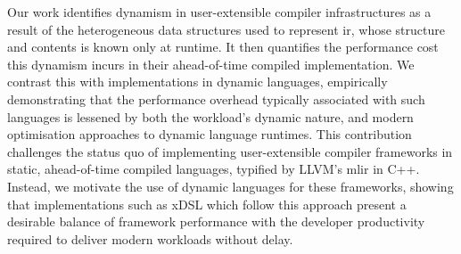 Our work identifies dynamism in user-extensible compiler infrastructures as a result of the heterogeneous data structures used to represent \ac{ir}, whose structure and contents is known only at runtime. It then quantifies the performance cost this dynamism incurs in their ahead-of-time compiled implementation.
We contrast this with implementations in dynamic languages, empirically demonstrating that the performance overhead typically associated with such languages is lessened by both the workload's dynamic nature, and modern optimisation approaches to dynamic language runtimes.
This contribution challenges the status quo of implementing user-extensible compiler frameworks in static, ahead-of-time compiled languages, typified by LLVM's \ac{mlir} in C++. Instead, we motivate the use of dynamic languages for these frameworks, showing that implementations such as xDSL which follow this approach present a desirable balance of framework performance with the developer productivity required to deliver modern workloads without delay.
